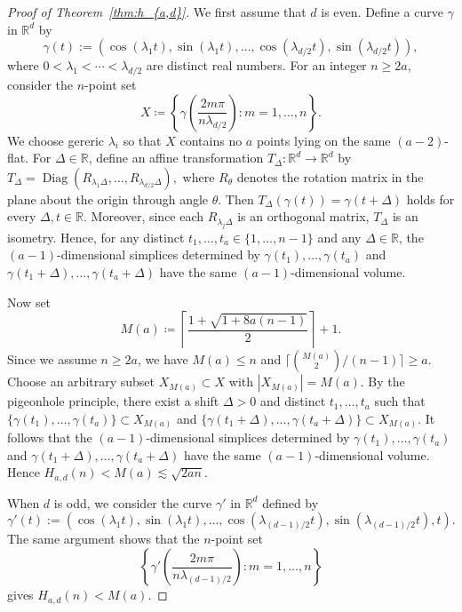 \documentclass[a4paper,oneside,10pt]{amsart}
\begin{document}
\begin{proof}[Proof of Theorem~\ref{thm:h_{a,d}}]
We first assume that \(d\) is even.
Define a curve \(\gamma\) in \(\mathbb R^d\) by
$$
\gamma(t):=
(\cos(\lambda_1 t),\sin(\lambda_1 t),\dots,\cos(\lambda_{d/2} t),\sin(\lambda_{d/2} t)),
$$
where
$
0<\lambda_1<\cdots<\lambda_{d/2}
$
are distinct real numbers.
For an integer \(n\geq2a\), consider the \(n\)-point set
\[
X \coloneqq \left\{ \gamma\!\left(\frac{2m\pi}{n\lambda_{d/2}}\right) : m=1,\ldots,n \right\}.
\]
We choose gereric $\lambda_i$ so that \(X\) contains no $a$ points lying on the same $(a-2)$-flat.
For \(\Delta\in\mathbb R\), define an affine transformation
$
T_\Delta:\mathbb R^d\to\mathbb R^d
$
by
$
T_\Delta=\operatorname{Diag}(R_{\lambda_1\Delta},\dots,R_{\lambda_{d/2}\Delta}),
$
where \(R_\theta\) denotes the rotation matrix in the plane about the origin through angle \(\theta\).
Then
$
T_\Delta(\gamma(t))=\gamma(t+\Delta)
$
holds for every \(\Delta, t\in\mathbb R\).
Moreover, since each \(R_{\lambda_j\Delta}\) is an orthogonal matrix, \(T_\Delta\) is an isometry.
Hence, for any distinct \(t_1,\dots,t_a\in\{1,\dots,n-1\}\) and any \(\Delta\in\mathbb R\), the \((a-1)\)-dimensional simplices determined by
$
\gamma(t_1),\dots,\gamma(t_a)
$
and
$
\gamma(t_1+\Delta),\dots,\gamma(t_a+\Delta)
$
have the same $(a-1)$-dimensional volume.

Now set
$$
M(a)\coloneqq
\left\lceil
\frac{1+\sqrt{1+8a(n-1)}}{2}
\right\rceil + 1.
$$
Since we assume $n \geq 2a$, we have $M(a) \leq n$ and $\lceil \binom{M(a)}{2}/(n-1) \rceil \geq a$.
Choose an arbitrary subset \(X_{M(a)} \subset X\) with \(|X_{M(a)}|=M(a)\). 
By the pigeonhole principle, there exist a shift $\Delta > 0$ and distinct $t_1, \ldots, t_a$ such that 
$\{ \gamma (t_1), \ldots, \gamma (t_a) \} \subset X_{M(a)}$ and $\{ \gamma (t_1 + \Delta), \ldots, \gamma (t_a + \Delta) \} \subset X_{M(a)}$.
It follows that the \((a-1)\)-dimensional simplices determined by
$
\gamma(t_1),\dots,\gamma(t_a)
$
and
$
\gamma(t_1+\Delta),\dots,\gamma(t_a+\Delta)
$
have the same \((a-1)\)-dimensional volume.
Hence
$
H_{a,d}(n)<M(a)\lesssim \sqrt{2an}.
$

When \(d\) is odd, we consider the curve \(\gamma'\) in \(\mathbb R^d\) defined by
\[
\gamma'(t):=
(\cos(\lambda_1 t),\sin(\lambda_1 t),\dots,\cos(\lambda_{(d-1)/2} t),\sin(\lambda_{(d-1)/2} t),t).
\]
The same argument shows that the \(n\)-point set
$$
\left\{ \gamma'\!\left(\frac{2m\pi}{n\lambda_{(d-1)/2}}\right) : m=1,\ldots,n \right\}
$$
gives
$
H_{a,d}(n)<M(a).
$
\end{proof}
\end{document}
